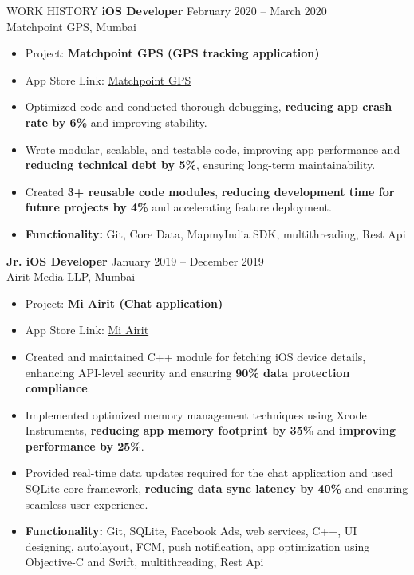 \documentclass{resume} %
\begin{document}
\begin{rSection}{WORK HISTORY}
\textbf{iOS Developer} \hfill February 2020 -- March 2020\\
Matchpoint GPS, Mumbai
\begin{itemize}
    \itemsep -3pt
    \item Project: \textbf{Matchpoint GPS (GPS tracking application)}
    \item App Store Link: \href{https://apps.apple.com/in/app/matchpointgps/id985079561}{Matchpoint GPS}
    \item Optimized code and conducted thorough debugging, \textbf{reducing app crash rate by 6\%} and improving stability.
    \item Wrote modular, scalable, and testable code, improving app performance and \textbf{reducing technical debt by 5\%}, ensuring long-term maintainability.
    \item Created \textbf{3+ reusable code modules}, \textbf{reducing development time for future projects by 4\%} and accelerating feature deployment.
    \item \textbf{Functionality:} Git, Core Data, MapmyIndia SDK, multithreading, Rest Api
\end{itemize}

\textbf{Jr. iOS Developer} \hfill January 2019 -- December 2019\\
Airit Media LLP, Mumbai
\begin{itemize}
    \itemsep -3pt
    \item Project: \textbf{Mi Airit (Chat application)}
    \item App Store Link: \href{https://itunes.apple.com/in/app/airit/id1274443050?mt=8}{Mi Airit}
    \item Created and maintained C++ module for fetching iOS device details, enhancing API-level security and ensuring \textbf{90\% data protection compliance}.
    \item Implemented optimized memory management techniques using Xcode Instruments, \textbf{reducing app memory footprint by 35\%} and \textbf{improving performance by 25\%}.
    \item Provided real-time data updates required for the chat application and used SQLite core framework, \textbf{reducing data sync latency by 40\%} and ensuring seamless user experience.
    \item \textbf{Functionality:} Git, SQLite, Facebook Ads, web services, C++, UI designing,
    autolayout, FCM, push notification, app optimization using
    Objective-C and Swift, multithreading, Rest Api
\end{itemize}


\end{rSection}
\end{document}
